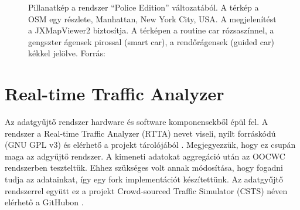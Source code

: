\documentclass[a4paper,12pt]{report}
\begin{document}
\begin{figure}[h]
\centering
{}
\quad
{}
\caption{Pillanatkép a rendszer ``Police Edition'' változatából. A térkép a OSM egy részlete, Manhattan, New York City, USA. A megjelenítést a JXMapViewer2 \cite{jxmapv} biztosítja. A térképen a routine car rózsaszínnel, a gengszter ágensek pirossal (smart car), a rendőrágensek (guided car) kékkel jelölve. Forrás: \cite{infocomjournal} \label{police}}
\end{figure}

\chapter{Real-time Traffic Analyzer}
\label{rttachapter}

Az adatgyűjtő rendszer hardware és software komponensekből épül fel. A rendszer a Real-time Traffic Analyzer (RTTA) nevet viseli, nyílt forráskódú (GNU GPL v3) és elérhető a projekt tárolójából \cite{rtta}. Megjegyezzük, hogy ez csupán maga az adgyűjtő rendszer. A kimeneti adatokat aggregáció után az OOCWC rendszerben teszteltük. Ehhez szükséges volt annak módosítása, hogy fogadni tudja az adatainkat, így egy fork implementációt készítettünk. Az adatgyűjtő rendszerrel együtt ez a projekt Crowd-sourced Traffic Simulator (CSTS) néven elérhető a GitHubon \cite{csts}. 
\end{document}
